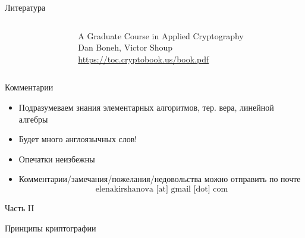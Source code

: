 \documentclass[usenames,dvipsnames,8pt,aspectratio=169]{beamer}
\begin{document}
\begin{frame}{Литература}
\begin{columns}[T]
\begin{column}{0.5\textwidth}
	\end{column}
	\begin{column}{0.55\textwidth}
	\vspace{40pt}
	A Graduate Course in Applied Cryptography \\[5pt]
	Dan Boneh, Victor Shoup \\[5pt]
	\url{https://toc.cryptobook.us/book.pdf}
	\end{column}
\end{columns}

\end{frame}

\begin{frame}{Комментарии}

\Large
\begin{itemize}
	\itemsep 8pt
	\item Подразумеваем знания элементарных алгоритмов, тер. вера, линейной алгебры
	\item Будет много англоязычных слов!
	\item  Опечатки неизбежны
	\item Комментарии/замечания/пожелания/недовольства можно отправить по почте
	\[
	\text{elenakirshanova [at] gmail [dot] com}
	\]
\end{itemize}

\end{frame}


\begin{frame}
Часть II \\ [10pt]
\begin{LARGE}
	
	\color{Orange}
	\Huge Принципы криптографии \\
	
\end{LARGE}
\end{frame}
\end{document}
